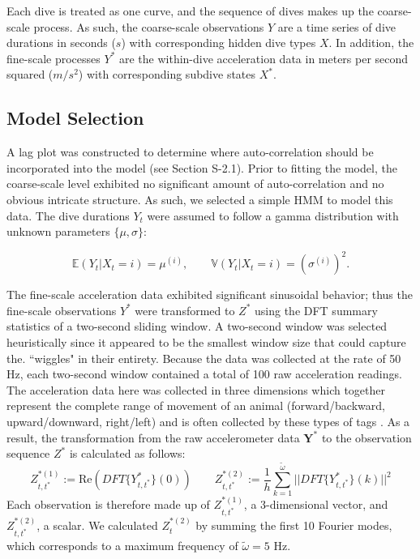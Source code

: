 Each dive is treated as one curve, and the sequence of dives makes up the coarse-scale process. As such, the coarse-scale observations $Y$ are a time series of dive durations in seconds ($s$) with corresponding hidden dive types $X$. In addition, the fine-scale processes $Y^*$ are the within-dive acceleration data in meters per second squared ($m/s^2$) with corresponding subdive states $X^*$.

\subsection{Model Selection}

A lag plot was constructed to determine where auto-correlation should be incorporated into the model (see Section S-2.1). Prior to fitting the model, the coarse-scale level exhibited no significant amount of auto-correlation and no obvious intricate structure. As such, we selected a simple HMM to model this data. The dive durations $Y_t$ were assumed to follow a gamma distribution with unknown parameters $\{\mu,\sigma\}$:

$$\mathbb{E}(Y_t|X_t = i) = \mu^{(i)}, \qquad \mathbb{V}(Y_t|X_t = i) = \left(\sigma^{(i)}\right)^2.$$

The fine-scale acceleration data exhibited significant sinusoidal behavior; thus the fine-scale observations $Y^*$ were transformed to $Z^*$ using the DFT summary statistics of a two-second sliding window. A two-second window was selected heuristically since it appeared to be the smallest window size that could capture the. ``wiggles" in their entirety. Because the data was collected at the rate of 50 Hz, each two-second window contained a total of 100 raw acceleration readings. The acceleration data here was collected in three dimensions which together represent the complete range of movement of an animal (forward/backward, upward/downward, right/left) and is often collected by these types of tags \citep{Cade:2017,Fehlmann:2017,Wright:2017}. As a result, the transformation from the raw accelerometer data $\mathbf{Y}^*$ to the observation sequence $Z^*$ is calculated as follows:
%
\begin{equation*}
    Z_{t,t^*}^{*(1)} := \text{Re}\left(DFT\{Y^*_{t,t^*}\}(0)\right) \qquad Z_{t,t^*}^{*(2)} := \frac{1}{h}\sum_{k=1}^{\tilde{\omega}}\bigg|\bigg|DFT\{Y^*_{t,t^*}\}(k)\bigg|\bigg|^2
\end{equation*}
%
Each observation is therefore made up of $Z_{t,t^*}^{*(1)}$, a 3-dimensional vector, and $Z_{t,t^*}^{*(2)}$, a scalar. We calculated $Z_t^{*(2)}$ by summing the first 10 Fourier modes, which corresponds to a maximum frequency of $\tilde \omega = 5$ Hz. 

